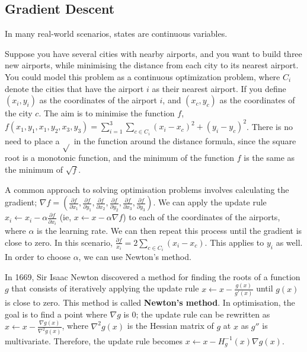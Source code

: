 
\subsection{Gradient Descent}
\label{sub_sec:gradient_descent}

In many real-world scenarios, states are continuous variables.

\begin{example}
    Suppose you have several cities with nearby airports, and you want to build three new airports, while minimising the distance from each city to its nearest airport. You could model this problem as a continuous optimization problem, where $C_{i}$ denote the cities that have the airport $i$ as their nearest airport. If you define $(x_{i}, y_{i})$ as the coordinates of the airport $i$, and $(x_{c}, y_{c})$ as the coordinates of the city $c$. The aim is to minimise the function $f$, $f(x_{1}, y_{1}, x_{1}, y_{2}, x_{3}, y_{3}) = \sum_{i=1}^{3} \sum_{c \in C_{i}} (x_{i} - x_{c})^{2} + (y_{i} - y_{c})^{2}$. There is no need to place a $\sqrt{}$ in the function around the distance formula, since the square root is a monotonic function, and the minimum of the function $f$ is the same as the minimum of $\sqrt{f}$.
\end{example}

\begin{solution}
    A common approach to solving optimisation problems involves calculating the gradient; $\nabla f = (\frac{\partial f}{\partial x_{1}}, \frac{\partial f}{\partial y_{1}}, \frac{\partial f}{\partial x_{2}}, \frac{\partial f}{\partial y_{2}}, \frac{\partial f}{\partial x_{3}}, \frac{\partial f}{\partial y_{3}})$. We can apply the update rule $x_{i} \leftarrow x_{i} - \alpha \frac{\partial f}{\partial x_{i}}$ (ie, $x \leftarrow x - \alpha \nabla f$) to each of the coordinates of the airports, where $\alpha$ is the learning rate. We can then repeat this process until the gradient is close to zero. In this scenario, $\frac{\partial f}{x_{i}} = 2 \sum_{c \in C_{i}} (x_{i} - x_{c})$. This applies to $y_{i}$ as well. In order to choose $\alpha$, we can use Newton's method.
\end{solution}

\begin{definition}
    In 1669, Sir Isaac Newton discovered a method for finding the roots of a function $g$ that consists of iteratively applying the update rule $x \leftarrow x - \frac{g(x)}{g'(x)}$ until $g(x)$ is close to zero. This method is called \textbf{Newton's method}. In optimisation, the goal is to find a point where $\nabla g$ is $0$; the update rule can be rewritten as $x \leftarrow x - \frac{\nabla g(x)}{\nabla^{2} g(x)}$, where $\nabla^{2} g(x)$ is the Hessian matrix of $g$ at $x$ as $g''$ is multivariate. Therefore, the update rule becomes $x \leftarrow x - H_{g}^{-1}(x) \nabla g(x)$.
\end{definition}

